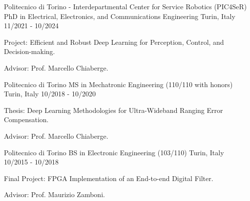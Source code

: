 

\begin{cventries}

  \cventry
    {Politecnico di Torino - Interdepartmental Center for Service Robotics (PIC4SeR)} %
    {PhD in Electrical, Electronics, and Communications Engineering} %
    {Turin, Italy} %
    {11/2021 - 10/2024} %
    {
      \begin{cvitems} %
        \item {Project: Efficient and Robust Deep Learning for Perception, Control, and Decision-making.}
        \item {Advisor: Prof. Marcello Chiaberge.}
      \end{cvitems}
    }
    
  \cventry
    {Politecnico di Torino} %
    {MS in Mechatronic Engineering (110/110 with honors)} %
    {Turin, Italy} %
    {10/2018 - 10/2020} %
    {
      \begin{cvitems} %
        \item {Thesis: Deep Learning Methodologies for Ultra-Wideband Ranging Error Compensation.}
        \item {Advisor: Prof. Marcello Chiaberge.}
      \end{cvitems}
    }

  \cventry
    {Politecnico di Torino} %
    {BS in Electronic Engineering (103/110)} %
    {Turin, Italy} %
    {10/2015 - 10/2018} %
    {
      \begin{cvitems} %
        \item {Final Project: FPGA Implementation of an End-to-end Digital Filter.}
        \item {Advisor: Prof. Maurizio Zamboni.}
      \end{cvitems}
    }
\end{cventries}
